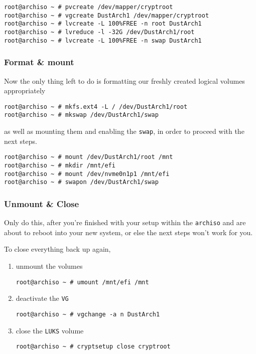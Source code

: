\documentclass[10pt]{dustdoc}
\begin{document}
\begin{verbatim}
root@archiso ~ # pvcreate /dev/mapper/cryptroot
root@archiso ~ # vgcreate DustArch1 /dev/mapper/cryptroot
root@archiso ~ # lvcreate -L 100%FREE -n root DustArch1
root@archiso ~ # lvreduce -l -32G /dev/DustArch1/root
root@archiso ~ # lvcreate -L 100%FREE -n swap DustArch1
\end{verbatim}

\subsubsection{Format \& mount}
\label{sec:format-and-mount}

Now the only thing left to do is formatting our freshly created logical volumes appropriately

\begin{verbatim}
root@archiso ~ # mkfs.ext4 -L / /dev/DustArch1/root
root@archiso ~ # mkswap /dev/DustArch1/swap
\end{verbatim}

\noindent
as well as mounting them and enabling the \texttt{swap}, in order to proceed with the next steps.

\begin{verbatim}
root@archiso ~ # mount /dev/DustArch1/root /mnt
root@archiso ~ # mkdir /mnt/efi
root@archiso ~ # mount /dev/nvme0n1p1 /mnt/efi
root@archiso ~ # swapon /dev/DustArch1/swap
\end{verbatim}

\subsubsection{Unmount \& Close}
\label{sec:unmount-and-close}

\begin{WARNING}
    Only do this, after you’re finished with your setup within the \texttt{archiso} and are about to reboot into your new system, or else the next steps won’t work for you.
\end{WARNING}

To close everything back up again,

\begin{enumerate}
    \item unmount the volumes

        \begin{verbatim}
root@archiso ~ # umount /mnt/efi /mnt
        \end{verbatim}

    \item deactivate the \texttt{VG}

        \begin{verbatim}
root@archiso ~ # vgchange -a n DustArch1
        \end{verbatim}

    \item close the \texttt{LUKS} volume

        \begin{verbatim}
root@archiso ~ # cryptsetup close cryptroot
        \end{verbatim}
\end{enumerate}
\end{document}
